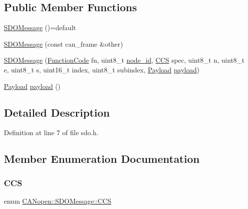 \subsection*{Public Member Functions}
\begin{DoxyCompactItemize}
\item 
\hyperlink{class_c_a_nopen_1_1_s_d_o_message_a6229048c08585beeb1e19d76ae0966cd}{S\+D\+O\+Message} ()=default
\item 
\hyperlink{class_c_a_nopen_1_1_s_d_o_message_a73ab5aad06fd6a6f53fb614f4d9a8465}{S\+D\+O\+Message} (const can\+\_\+frame \&other)
\item 
\hyperlink{class_c_a_nopen_1_1_s_d_o_message_ad299429ca0de823d392fb24addf4fe85}{S\+D\+O\+Message} (\hyperlink{class_c_a_nopen_1_1_message_a0f8f95e4ea1284011cd122629edc5468}{Function\+Code} fn, uint8\+\_\+t \hyperlink{class_c_a_nopen_1_1_message_a845fe0c7682bd6eeef0a5dd87b5e3c63}{node\+\_\+id}, \hyperlink{class_c_a_nopen_1_1_s_d_o_message_a87e867140acb008777fb9419626d19ea}{C\+CS} spec, uint8\+\_\+t n, uint8\+\_\+t e, uint8\+\_\+t s, uint16\+\_\+t index, uint8\+\_\+t subindex, \hyperlink{class_c_a_nopen_1_1_payload}{Payload} \hyperlink{class_c_a_nopen_1_1_s_d_o_message_a051509ddb3a59dfe066f9d90c80c2eec}{payload})
\item 
\hyperlink{class_c_a_nopen_1_1_payload}{Payload} \hyperlink{class_c_a_nopen_1_1_s_d_o_message_a051509ddb3a59dfe066f9d90c80c2eec}{payload} ()
\end{DoxyCompactItemize}


\subsection{Detailed Description}


Definition at line 7 of file sdo.\+h.



\subsection{Member Enumeration Documentation}
\mbox{\label{class_c_a_nopen_1_1_s_d_o_message_a87e867140acb008777fb9419626d19ea}} 
\subsubsection{\texorpdfstring{C\+CS}{CCS}}
{\footnotesize\ttfamily enum \hyperlink{class_c_a_nopen_1_1_s_d_o_message_a87e867140acb008777fb9419626d19ea}{C\+A\+Nopen\+::\+S\+D\+O\+Message\+::\+C\+CS}}

